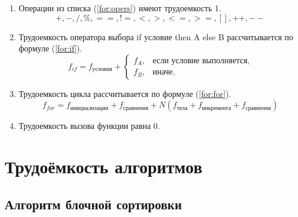 \begin{enumerate}
	\item Операции из списка (\ref{for:opers}) имеют трудоемкость 1.
	\begin{equation}
	\label{for:opers}
	+, -, /, \%, ==, !=, <, >, <=, >=, [], ++, {-}-
	\end{equation}
	\item Трудоемкость оператора выбора if условие then A else B рассчитывается по формуле (\ref{for:if}).
	\begin{equation}
	\label{for:if}
	f_{if} = f_{\text{условия}} +
	\begin{cases}
	f_A, & \text{если условие выполняется,}\\
	f_B, & \text{иначе.}
	\end{cases}
	\end{equation}
	\item Трудоемкость цикла рассчитывается по формуле (\ref{for:for}).
	\begin{equation}
	\label{for:for}
	f_{for} = f_{\text{инициализации}} + f_{\text{сравнения}} + N(f_{\text{тела}} + f_{\text{инкремента}} + f_{\text{сравнения}})
	\end{equation}
	\item Трудоемкость вызова функции равна 0.
\end{enumerate}

\section{Трудоёмкость алгоритмов}

\subsection{Алгоритм блочной сортировки}


